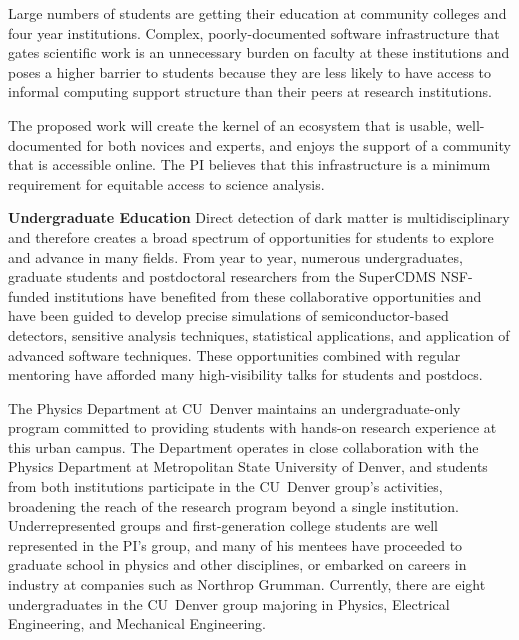 Large numbers of students are getting their education at community colleges and four year institutions.  Complex, poorly-documented software infrastructure that gates scientific work is an unnecessary burden on faculty at these institutions and poses a higher barrier to students because they are less likely to have access to informal computing support structure than their peers at research institutions.

The proposed work will create the kernel of an ecosystem that is usable, well-documented for both novices and experts, and enjoys the support of a community that is accessible online.  The PI believes that this infrastructure is a minimum requirement for equitable access to science analysis.



\textbf{Undergraduate Education}
Direct detection of dark matter is multidisciplinary and therefore creates a broad spectrum of opportunities for students to explore and advance in many fields. From year to year, numerous undergraduates, graduate students and postdoctoral researchers from the SuperCDMS NSF-funded institutions have benefited from these collaborative opportunities and have been guided to develop precise simulations of semiconductor-based detectors, sensitive analysis techniques, statistical applications, and application of advanced software techniques. These opportunities combined with regular mentoring have afforded many high-visibility talks for students and postdocs. 

The Physics Department at CU~Denver maintains an undergraduate-only program committed to providing students with hands-on research experience at this urban campus. The Department operates in close collaboration with the Physics Department at Metropolitan State University of Denver, and students from both institutions participate in the CU~Denver group’s activities, broadening the reach of the research program beyond a single institution. Underrepresented groups and first-generation college students are well represented in the PI’s group, and many of his mentees have proceeded to graduate school in physics and other disciplines, or embarked on careers in industry at companies such as Northrop Grumman. Currently, there are eight undergraduates in the CU~Denver group majoring in Physics, Electrical Engineering, and Mechanical Engineering.  


